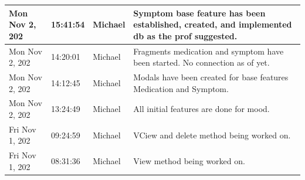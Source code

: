 \documentclass[11pt]{article}
\begin{document}
\begin{center}
\begin{longtable}{|p{2.7cm}|l|p{2cm}|p{8cm}|}
           \hline Mon Nov 2,  202                              & 15:41:54                           & Michael                                 & Symptom base feature has been established, created, and implemented db as the prof suggested.                                                                                                                                                                                                              \\
           \hline Mon Nov 2,  202                              & 14:20:01                           & Michael                                 & Fragments medication and symptom have been started. No connection as of yet.                                                                                                                                                                                                                               \\
           \hline Mon Nov 2,  202                              & 14:12:45                           & Michael                                 & Modals have been created for base features Medication and Symptom.                                                                                                                                                                                                                                         \\
           \hline Mon Nov 2,  202                              & 13:24:49                           & Michael                                 & All initial features are done for mood.                                                                                                                                                                                                                                                                    \\
           \hline Fri Nov 1,  202                              & 09:24:59                           & Michael                                 & VCiew and delete method being worked on.                                                                                                                                                                                                                                                                   \\
           \hline Fri Nov 1,  202                              & 08:31:36                           & Michael                                 & View method being worked on.                                                                                                                                                                                                                                                                               \\

\end{longtable}
\end{center}
\end{document}
